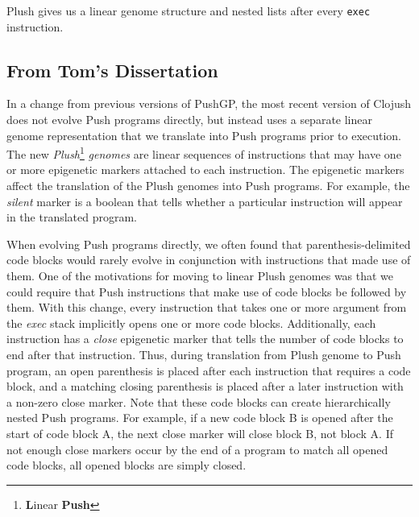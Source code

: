 Plush gives us a linear genome structure and nested lists after every \texttt{exec}
instruction.


\subsection{From Tom's Dissertation}

In a change from previous versions of PushGP, the most recent version of Clojush does not evolve Push programs directly, but instead uses a separate linear genome representation that we translate into Push programs prior to execution. The new \textit{Plush}\footnote{\textbf{L}inear \textbf{Push}} \textit{genomes} are linear sequences of instructions that may have one or more epigenetic markers attached to each instruction. The epigenetic markers affect the translation of the Plush genomes into Push programs. For example, the \textit{silent} marker is a boolean that tells whether a particular instruction will appear in the translated program.

When evolving Push programs directly, we often found that parenthesis-delimited code blocks would rarely evolve in conjunction with instructions that made use of them. One of the motivations for moving to linear Plush genomes was that we could require that Push instructions that make use of code blocks be followed by them. With this change, every instruction that takes one or more argument from the \textit{exec} stack implicitly opens one or more code blocks. Additionally, each instruction has a \textit{close} epigenetic marker that tells the number of code blocks to end after that instruction. Thus, during translation from Plush genome to Push program, an open parenthesis is placed after each instruction that requires a code block, and a matching closing parenthesis is placed after a later instruction with a non-zero close marker. Note that these code blocks can create hierarchically nested Push programs. For example, if a new code block B is opened after the start of code block A, the next close marker will close block B, not block A. If not enough close markers occur by the end of a program to match all opened code blocks, all opened blocks are simply closed.

